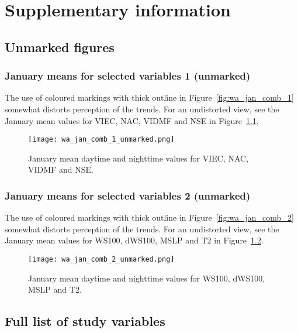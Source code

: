 \chapter{Supplementary information}
\label{app:supp}

\section{Unmarked figures}
\label{sec:unmarked}

\subsection{January means for selected variables 1 (unmarked)}

The use of coloured markings with thick outline in Figure~\ref{fig:wa_jan_comb_1} somewhat distorts perception of the trends. For an undistorted view, see the January mean values for \ac{VIEC}, \ac{NAC}, \ac{VIDMF} and \ac{NSE} in Figure~\ref{fig:wa_jan_comb_1_unmarked}.

\begin{figure}[!htp]
	\centering
	\texttt{[image: wa\_jan\_comb\_1\_unmarked.png]}
	\caption[January means for selected variables 1 (unmarked)]{January mean daytime and nighttime values for \acs{VIEC}, \acs{NAC}, \acs{VIDMF} and \acs{NSE}.}
	\label{fig:wa_jan_comb_1_unmarked}
\end{figure}

\subsection{January means for selected variables 2 (unmarked)}

The use of coloured markings with thick outline in Figure~\ref{fig:wa_jan_comb_2} somewhat distorts perception of the trends. For an undistorted view, see the January mean values for \ac{WS100}, \ac{dWS100}, \ac{MSLP} and \ac{T2} in Figure~\ref{fig:wa_jan_comb_2_unmarked}.

\begin{figure}[!htp]
	\centering
	\texttt{[image: wa\_jan\_comb\_2\_unmarked.png]}
	\caption[January means for selected variables 2 (unmarked)]{January mean daytime and nighttime values for \acs{WS100}, \acs{dWS100}, \acs{MSLP} and \acs{T2}.}
	\label{fig:wa_jan_comb_2_unmarked}
\end{figure}

\section{Full list of study variables}

